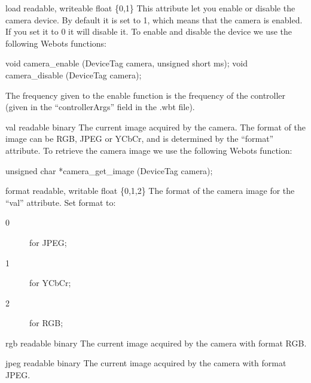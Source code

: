 \noindent
\begin{itemize}
\begin{attribute}{load}
  {readable, writeable}
  {float}
  {\{0,1\}}
  This attribute let you enable or disable the camera
  device.  By default it is set to 1, which means that the camera is
  enabled. If you set it to 0 it will disable it.  To enable and
  disable the device we use the following Webots functions:


\begin{cxx}
void camera_enable (DeviceTag camera, unsigned short ms);
void camera_disable (DeviceTag camera);
\end{cxx}

The frequency given to the enable function is the frequency of the
\urbi controller (given in the ``controllerArgs'' field in the .wbt
file).
\end{attribute}

\begin{attribute}{val}
  {readable}
  {binary}
  {}
  The current image acquired by the camera. The format of
  the image can be RGB, JPEG or YCbCr, and is determined by the
  ``format'' attribute.  To retrieve the camera image we use the
  following Webots function:


\begin{cxx}
unsigned char *camera_get_image (DeviceTag camera);
\end{cxx}
\end{attribute}

\begin{attribute}{format}
  {readable, writable}
  {float}
  {\{0,1,2\}}
  The format of the camera image for the ``val''
  attribute. Set format to:

  \begin{description}
  \item[0] for JPEG;
  \item[1] for YCbCr;
  \item[2] for RGB;
  \end{description}
\end{attribute}

\begin{attribute}{rgb}
  {readable}
  {binary}
  {}
  The current image acquired by the camera with format
  RGB.
\end{attribute}

\begin{attribute}{jpeg}
  {readable}
  {binary}
  {}
  The current image acquired by the camera with format
  JPEG.
\end{attribute}


\end{itemize}
